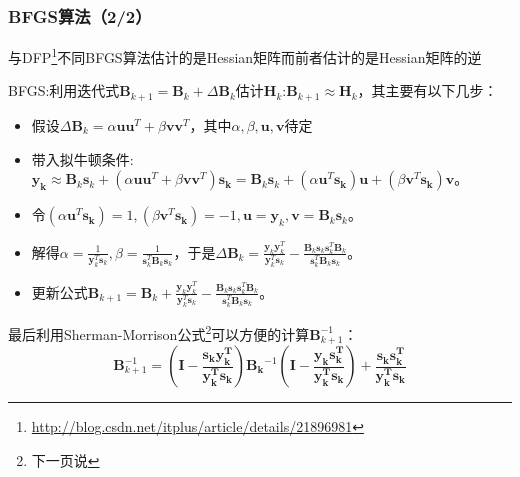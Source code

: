 \documentclass{beamer}
\begin{document}
\begin{frame}\frametitle{BFGS算法（2/2）}
{\color{red}与DFP\footnote{\url{http://blog.csdn.net/itplus/article/details/21896981}}不同BFGS算法估计的是Hessian矩阵而前者估计的是Hessian矩阵的逆}

BFGS:利用迭代式$\bm{B}_{k+1}=\bm{B}_k+\Delta \bm{B}_k$估计$\bm{H}_k$:$\bm{B}_{k+1}\approx \bm{H}_k$，其主要有以下几步：
\begin{itemize}
\item 假设$\Delta\bm{B}_k=\alpha \bm{uu}^{T}+\beta \bm{vv}^{T}$，其中$\alpha,\beta,\bm{u},\bm{v}$待定
\item 带入拟牛顿条件:$\bm{y_k}\approx \bm{B}_k\bm{s}_k+(\alpha \bm{uu}^{T}+\beta \bm{vv}^{T})\bm{s_k}=\bm{B}_k\bm{s}_k+(\alpha \bm{u}^{T}\bm{s_k})\bm{u}+(\beta \bm{v}^{T}\bm{s_k})\bm{v}$。
\item 令$(\alpha \bm{u}^{T}\bm{s_k})=1,(\beta \bm{v}^{T}\bm{s_k})=-1,\bm{u}=\bm{y}_k,\bm{v}=\bm{B}_k\bm{s}_k$。
\item 解得$\alpha=\frac{1}{\bm{y}_{k}^{T}\bm{s}_k},\beta=\frac{1}{\bm{s}_{k}^{T}\bm{B}_{k}\bm{s}_k}$，于是$\Delta \bm{B}_k=\frac{\bm{y}_{k}\bm{y}_{k}^{T}}{\bm{y}_{k}^{T}\bm{s}_k}-\frac{\bm{B}_{k}\bm{s}_k\bm{s}_{k}^{T}\bm{B}_{k}}{\bm{s}_{k}^{T}\bm{B}_{k}\bm{s}_k}$。
\item 更新公式$\bm{B}_{k+1}=\bm{B}_k+\frac{\bm{y}_{k}\bm{y}_{k}^{T}}{\bm{y}_{k}^{T}\bm{s}_k}-\frac{\bm{B}_{k}\bm{s}_k\bm{s}_{k}^{T}\bm{B}_{k}}{\bm{s}_{k}^{T}\bm{B}_{k}\bm{s}_k}$。
\end{itemize}
最后利用Sherman-Morrison公式\footnote{下一页说}可以方便的计算$\bm{B}_{k+1}^{-1}$：
\begin{displaymath}
\bm{B}_{k+1}^{-1}=\left(\bm{I}-\frac{\bm{s_ky_{k}^{T}}}{\bm{y_{k}^{T}s_{k}}}\right)\bm{B_k}^{-1}\left(\bm{I}-\frac{\bm{y_ks_{k}^{T}}}{\bm{y_{k}^{T}s_{k}}}\right)+\frac{\bm{s_{k}s_{k}^{T}}}{\bm{y_{k}^{T}s_{k}}}
\end{displaymath}
\end{frame}
\end{document}
